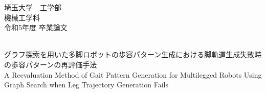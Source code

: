 \thispagestyle{empty}
\newcommand{\ctext}[1]{\textcolor[rgb]{0.65, 0.65, 0.65}{\raise0.2ex\hbox{\textcircled{\scriptsize{#1}}}}}
\begin{center}
        {\huge 埼玉大学　工学部} \\
        {\huge 機械工学科} \\        
        \vspace{10mm}
        {\Huge 令和5年度 \quad 卒業論文}\\
        \vspace{10mm}　
        
        {\Huge グラフ探索を用いた多脚ロボットの歩容パターン生成における脚軌道生成失敗時の歩容パターンの再評価手法} \\
        \vspace{10mm}
        {\LARGE A Reevaluation Method of Gait Pattern Generation for Multilegged Robots Using Graph Search when Leg Trajectory Generation Fails} \\        
        \vspace{10mm} %
 \end{center}
        
